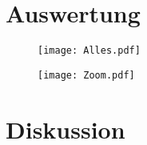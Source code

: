 \chapter{Auswertung}

\begin{figure}[htbp]
    \centering
    \texttt{[image: Alles.pdf]}
    \caption{%
    }
    \label{fig:}
\end{figure}

\begin{figure}[htbp]
    \centering
    \texttt{[image: Zoom.pdf]}
    \caption{%
    }
    \label{fig:}
\end{figure}

\chapter{Diskussion}

\printbibliography



